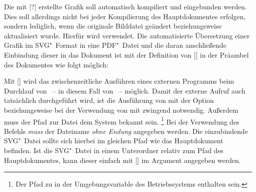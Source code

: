 Die mit |?| erstellte Grafik soll automatisch kompiliert 
und eingebunden werden. Dies soll allerdings nicht bei jeder Kompilierung des 
Hauptdokumentes erfolgen, sondern lediglich, wenn die originale Bilddatei 
geändert beziehungsweise aktualisiert wurde. Hierfür wird  
verwendet. Die automatisierte Übersetzung einer Grafik im SVG"~Format in eine 
PDF"~Datei und die daran anschließende Einbindung dieser in das Dokument ist 
mit der Definition von [] 
in der Präambel des Dokumentes wie folgt möglich:
%
\begin{Declaration*}{}
\begin{quoting}
\end{quoting}
\end{Declaration*}
%
Mit [] wird das 
zwischenzeitliche Ausführen eines externen Programms beim Durchlauf von 
~-- in diesem Fall von ~-- möglich. Damit 
der externe Aufruf auch tatsächlich durchgeführt wird, ist die Ausführung von 
 mit der Option  beziehungsweise bei 
der Verwendung von  mit  
zwingend notwendig. Außerdem muss der Pfad zur Datei  dem 
System bekannt sein.%
\footnote{%
  Der Pfad zu  in der Umgebungsvariable  des 
  Betriebssystems enthalten sein.
}
Bei der Verwendung des Befehls  \emph{muss} der Dateiname 
\emph{ohne Endung} angegeben werden. Die einzubindende SVG"~Datei sollte sich 
hierbei im gleichen Pfad wie das Hauptdokument befinden. Ist die SVG"~Datei in 
einem Unterordner relativ zum Pfad des Hauptdokumentes, kann dieser einfach mit 
[] im Argument 
angegeben werden.



